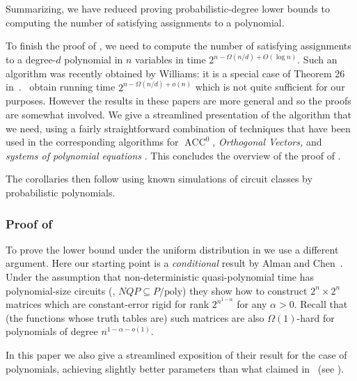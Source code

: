 \documentclass{toc}
\DeclareMathOperator{\ACC}{\mathrm{ACC}}  %
\newcommand{\poly}{\mathrm{poly}}
\begin{document}
\medskip

Summarizing, we have reduced proving probabilistic-degree lower bounds
to computing the number of satisfying assignments to a polynomial.

\medskip

To finish the proof of ,
we need to compute the number of satisfying assignments to a degree-$d$
polynomial in $n$ variables in time $2^{n-\Omega(n/d)+O(\log n)}$.
Such an algorithm was recently obtained by Williams: it is a special
case of Theorem 26 in~\cite{DBLP:conf/coco/Williams18}.~\cite{DBLP:conf/soda/LokshtanovPTWY17}
obtain running time $2^{n-\Omega(n/d)+o(n)}$ which is not quite sufficient
for our purposes. However the results in these papers are more general
and so the proofs are somewhat involved. We give a streamlined presentation
of the algorithm that we need, using a fairly straightforward combination
of techniques that have been used in the corresponding algorithms
for $\ACC^{0}$, \emph{Orthogonal Vectors, }and \emph{systems of polynomial
equations} \cite{Williams14-acc-jacm,DBLP:conf/soda/ChanW16,DBLP:conf/soda/LokshtanovPTWY17}.
This concludes the overview of the proof of .

The corollaries then follow using known simulations of circuit classes
by probabilistic polynomials.

\subsubsection{Proof of }

To prove the lower bound under the uniform distribution
in  we use a different argument. Here our starting
point is a \emph{conditional }result by Alman and Chen~\cite{AlmanC19}.
Under the assumption that non-deterministic quasi-polynomial time
has polynomial-size circuits (\ie, $NQP\subseteq P/\poly$) they
show how to construct $2^{n}\times2^{n}$ matrices which are constant-error
rigid for rank $2^{n^{1-\alpha}}$ for any $\alpha>0$. Recall that
(the functions whose truth tables are) such matrices are also $\Omega(1)$-hard
for polynomials of degree $n^{1-\alpha-o(1)}$.

In this paper we also give a streamlined exposition of their result
for the case of polynomials, achieving slightly better parameters
than what claimed in~\cite{AlmanC19} (see ).
\end{document}
